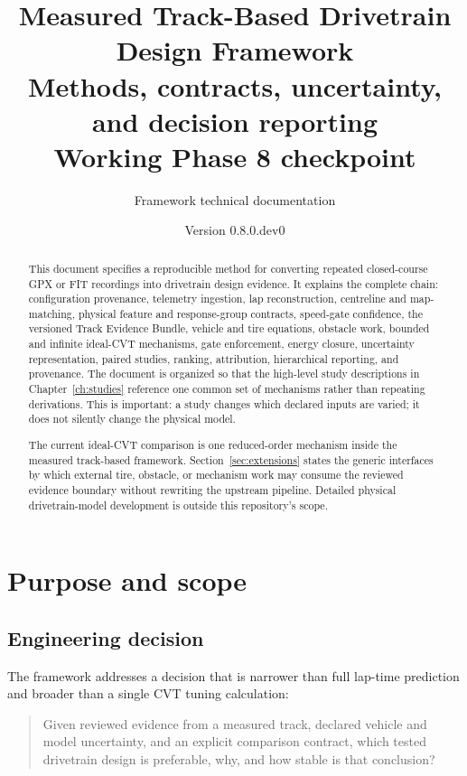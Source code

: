\documentclass[11pt,oneside]{report}
\title{\textbf{Measured Track-Based Drivetrain Design Framework}\\
       \Large Methods, contracts, uncertainty, and decision reporting\\[1em]
       \large Working Phase 8 checkpoint}
\author{Framework technical documentation}
\date{Version 0.8.0.dev0}
\newcommand{\bundle}{Track Evidence Bundle}
\begin{document}
\maketitle

\begin{abstract}
This document specifies a reproducible method for converting repeated closed-course
GPX or FIT recordings into drivetrain design evidence.  It explains the complete chain:
configuration provenance, telemetry ingestion, lap reconstruction, centreline and
map-matching, physical feature and response-group contracts, speed-gate confidence,
the versioned \bundle, vehicle and tire equations, obstacle work, bounded and
infinite ideal-CVT mechanisms, gate enforcement, energy closure, uncertainty
representation, paired studies, ranking, attribution, hierarchical reporting, and
provenance.  The document is organized so that the high-level study descriptions in
Chapter~\ref{ch:studies} reference one common set of mechanisms rather than repeating
derivations.  This is important: a study changes which declared inputs are varied; it
does not silently change the physical model.

The current ideal-CVT comparison is one reduced-order mechanism inside the measured
track-based framework.  Section~\ref{sec:extensions} states the generic interfaces by
which external tire, obstacle, or mechanism work may consume the reviewed evidence
boundary without rewriting the upstream pipeline.  Detailed physical drivetrain-model
development is outside this repository's scope.
\end{abstract}

\tableofcontents
\clearpage
{}

\chapter{Purpose and scope}\label{ch:purpose}

\section{Engineering decision}

The framework addresses a decision that is narrower than full lap-time prediction and
broader than a single CVT tuning calculation:

\begin{quote}
Given reviewed evidence from a measured track, declared vehicle and model uncertainty,
and an explicit comparison contract, which tested drivetrain design is preferable, why,
and how stable is that conclusion?
\end{quote}
\end{document}
